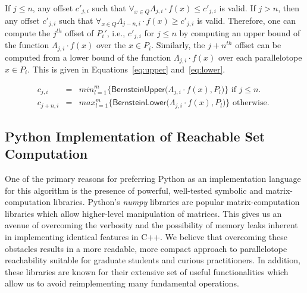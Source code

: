 \documentclass[EPiC]{easychair}
\begin{document}
%
%
If $j \leq n$, any offset $c'_{j,i}$ such that $\forall_{x\in Q} \Lambda_{j,i} \cdot f(x) \leq c'_{j,i}$ is valid.
%
%
If $j > n$, then any offset $c'_{j,i}$ such that $\forall_{x \in Q} \Lambda_{j-n,i} \cdot f(x) \geq c'_{j,i}$ is valid.
%
Therefore, one can compute the $j^{th}$ offset of $P_i'$, i.e., $c'_{j,i}$ for $j \leq n$ by computing an upper bound of the function $\Lambda_{j,i} \cdot f(x)$ over the $x\in P_i$.
%
Similarly, the $j+n^{th}$ offset can be computed from a lower bound of the function $\Lambda_{j,i} \cdot f(x)$ over each parallelotope $x\in P_i$.
%
This is given in Equations~\ref{eq:upper} and~\ref{eq:lower}.

\begin{eqnarray}
c_{j,i} &=& min_{l = 1}^{m} \Big\{ \mathsf{BernsteinUpper}\big(\Lambda_{j,i} \cdot f(x), P_l \big) \Big\} \mbox{ if } j \leq n. \label{eq:upper} \\
c_{j+n,i} &=& max_{l = 1}^{m} \Big\{ \mathsf{BernsteinLower}\big(\Lambda_{j,i} \cdot f(x), P_l \big) \Big\} \mbox{ otherwise. } \label{eq:lower}
\end{eqnarray}

\subsection{Python Implementation of Reachable Set Computation}

One of the primary reasons for preferring Python as an implementation language for this algorithm is the presence of powerful, well-tested symbolic and matrix-computation libraries.
%
Python's \emph{numpy} libraries are popular matrix-computation libraries which allow higher-level manipulation of matrices. This gives us an avenue of overcoming the verbosity and the possibility of memory leaks inherent in implementing identical features in C++. We believe that overcoming these obstacles results in a more readable, more compact approach to parallelotope reachability suitable for graduate students and curious practitioners. In addition, these libraries are known for their extensive set of useful functionalities which allow us to avoid reimplementing many fundamental operations.
\end{document}
